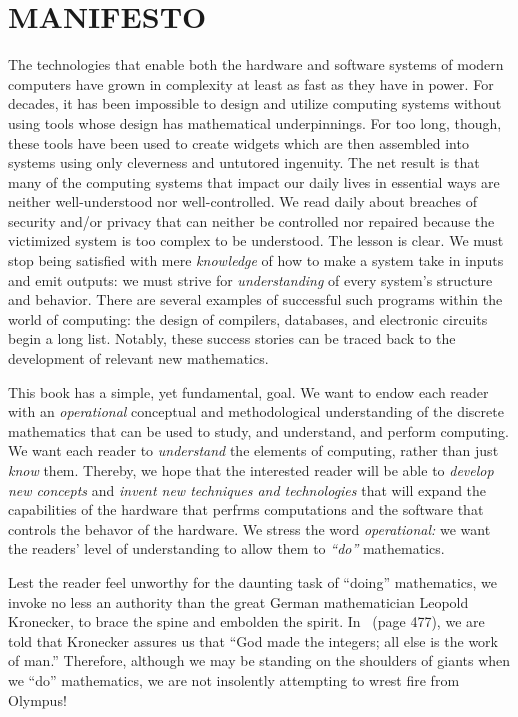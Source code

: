 
\chapter*{MANIFESTO}

The technologies that enable both the hardware and software systems of
modern computers have grown in complexity at least as fast as they
have in power.  For decades, it has been impossible to design and
utilize computing systems without using tools whose design has
mathematical underpinnings.  For too long, though, these tools have
been used to create widgets which are then assembled into systems
using only cleverness and untutored ingenuity.  The net result is that
many of the computing systems that impact our daily lives in essential
ways are neither well-understood nor well-controlled.  We read daily
about breaches of security and/or privacy that can neither be
controlled nor repaired because the victimized system is too complex
to be understood.  The lesson is clear.  We must stop being satisfied
with mere {\em knowledge} of how to make a system take in inputs and
emit outputs: we must strive for {\em understanding} of every system's
structure and behavior.  There are several examples of successful such
programs within the world of computing: the design of compilers,
databases, and electronic circuits begin a long list.  Notably, these
success stories can be traced back to the development of relevant new
mathematics.

This book has a simple, yet fundamental, goal.  We want to endow each
reader with an {\em operational} conceptual and methodological
understanding of the discrete mathematics that can be used to study,
and understand, and perform computing.  We want each reader to {\em
  understand} the elements of computing, rather than just {\em know}
them.  Thereby, we hope that the interested reader will be able to
{\em develop new concepts} and {\em invent new techniques and
  technologies} that will expand the capabilities of the hardware that
perfrms computations and the software that controls the behavor of the
hardware.  We stress the word {\it operational:} we want the readers'
level of understanding to allow them to {\em ``do''} mathematics.

\bigskip

Lest the reader feel unworthy for the daunting task of ``doing''
mathematics, we invoke no less an authority than the great German
mathematician Leopold Kronecker,  to brace
the spine and embolden the spirit.  In~\cite{Bell86} (page 477), we
are told that Kronecker assures us that ``God made the integers; all
else is the work of man.''  Therefore, although we may be standing on
the shoulders of giants when we ``do'' mathematics, we are not
insolently attempting to wrest fire from Olympus!

